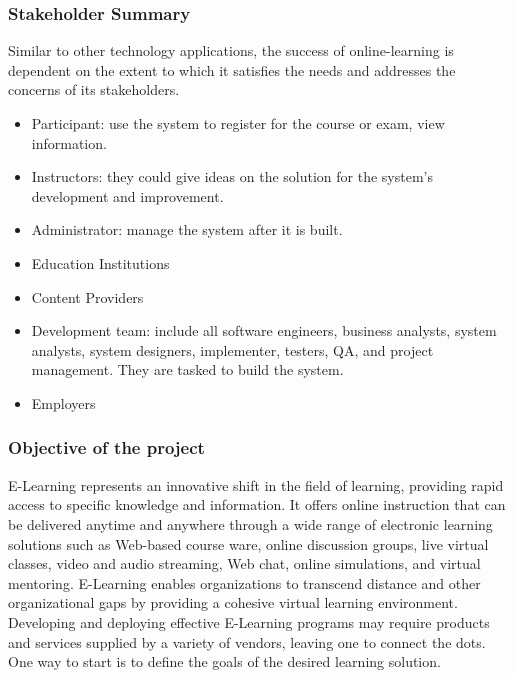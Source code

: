 \documentclass{scrartcl}
\begin{document}
  	\subsubsection{Stakeholder Summary}
  	Similar to other technology applications, the success of online-learning is dependent on the extent to which it satisfies the needs and addresses the concerns of its stakeholders.
  	\begin{itemize}
  	\item Participant: use the system to register for the course or exam, view 			information.
  	\item Instructors: they could give ideas on the solution for the system’s development and improvement.
  	\item Administrator: manage the system after it is built.
  	\item Education Institutions 
  	\item Content Providers
  	\item Development team: include all software engineers, business analysts, system analysts, system designers, implementer, testers, QA, and project management. They are tasked to build the system.
  	\item Employers
  	\end{itemize}
  	
  	\subsubsection{Objective of the project}
  	E-Learning represents an innovative shift in the field of learning, providing rapid access to specific knowledge and information. It offers online instruction that can be delivered anytime and anywhere through a wide range of electronic learning solutions such as Web-based course ware, online discussion groups, live virtual classes, video and audio streaming, Web chat, online simulations, and virtual mentoring. E-Learning enables organizations to transcend distance and other organizational gaps by providing a cohesive virtual learning environment. Developing and deploying effective E-Learning programs may require products and services supplied by a variety of vendors, leaving one to connect the dots. One way to start is to define the goals of the desired learning solution. 
\end{document}

